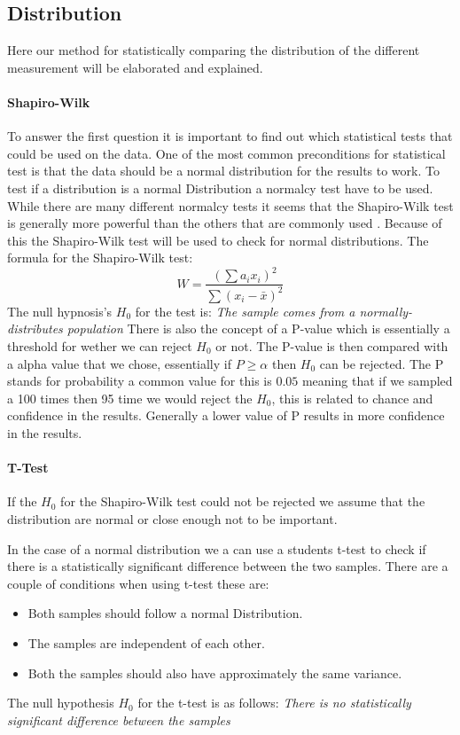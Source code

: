 \subsection{Distribution}
Here our method for statistically comparing the distribution of the different measurement will be elaborated and explained.

\paragraph{Shapiro-Wilk}
To answer the first question it is important to find out which statistical tests that could be used on the data. One of the most common preconditions for statistical test is that the data should be a normal distribution for the results to work. To test if a distribution is a normal Distribution a normalcy test have to be used. While there are many different normalcy tests it seems that the Shapiro-Wilk test is generally more powerful than the others that are commonly used \cite{razali2011power}. Because of this the Shapiro-Wilk test will be used to check for normal distributions. The formula for the Shapiro-Wilk test:
$$W=\frac{( \sum{a_i x_i} )^2}{\sum{(x_i - \bar{x})^2}}$$
The null hypnosis's $H_0$ for the test is:
\textit{The sample comes from a normally-distributes population}
There is also the concept of a P-value which is essentially a threshold for wether we can reject $H_0$ or not. The P-value is then compared with a alpha value that we chose, essentially if $P \geq \alpha$ then $H_0$ can be rejected. The P stands for probability a common value for this is $0.05$ meaning that if we sampled a 100 times then 95 time we would reject the $H_0$, this is related to chance and confidence in the results. Generally a lower value of P results in more confidence in the results.
\paragraph{T-Test}
If the $H_0$ for the Shapiro-Wilk test could not be rejected we assume that the distribution are normal or close enough not to be important.

In the case of a normal distribution we a can use a students t-test to check if there is a statistically significant difference between the two samples. There are a couple of conditions when using t-test these are:
\begin{itemize}
    \item Both samples should follow a normal Distribution.
    \item The samples are independent of each other.
    \item Both the samples should also have approximately the same variance.
\end{itemize}
The null hypothesis $H_0$ for the t-test is as follows: \textit{There is no statistically significant difference between the samples}

